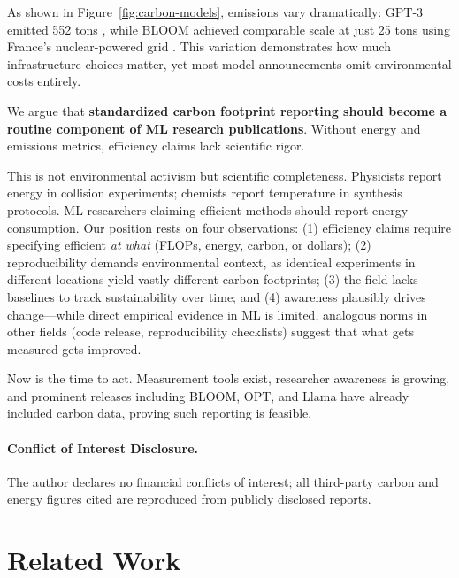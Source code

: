 \documentclass{article}
\theoremstyle{plain}
\theoremstyle{definition}
\theoremstyle{remark}
\begin{document}

As shown in Figure~\ref{fig:carbon-models}, emissions vary dramatically: GPT-3 emitted 552 tons \cite{patterson2021carbon}, while BLOOM achieved comparable scale at just 25 tons using France's nuclear-powered grid \cite{luccioni2023estimating}. This variation demonstrates how much infrastructure choices matter, yet most model announcements omit environmental costs entirely.

We argue that \textbf{standardized carbon footprint reporting should become a routine component of ML research publications}. Without energy and emissions metrics, efficiency claims lack scientific rigor.

This is not environmental activism but scientific completeness. Physicists report energy in collision experiments; chemists report temperature in synthesis protocols. ML researchers claiming efficient methods should report energy consumption. Our position rests on four observations: (1) efficiency claims require specifying efficient \textit{at what} (FLOPs, energy, carbon, or dollars); (2) reproducibility demands environmental context, as identical experiments in different locations yield vastly different carbon footprints; (3) the field lacks baselines to track sustainability over time; and (4) awareness plausibly drives change---while direct empirical evidence in ML is limited, analogous norms in other fields (code release, reproducibility checklists) suggest that what gets measured gets improved.

Now is the time to act. Measurement tools exist, researcher awareness is growing, and prominent releases including BLOOM, OPT, and Llama have already included carbon data, proving such reporting is feasible.

\paragraph{Conflict of Interest Disclosure.}
The author declares no financial conflicts of interest; all third-party carbon and energy figures cited are reproduced from publicly disclosed reports.

\section{Related Work}
\end{document}
